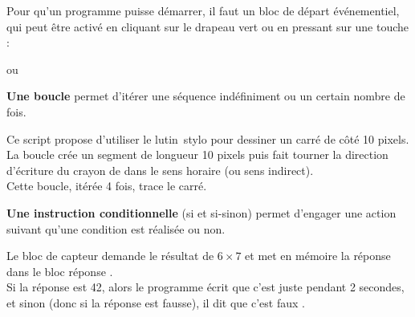 Pour qu'un programme puisse démarrer, il faut un bloc de départ événementiel, qui peut être activé en cliquant sur le drapeau vert ou en pressant sur une touche : \begin{scratch}
   {
   }
\end{scratch}
\; ou \;
\begin{scratch}
\end{scratch}

\bigskip

{\bf Une boucle} permet d'itérer une séquence indéfiniment ou un certain nombre de fois. \\ [-8mm]
\begin{exemple}
   \vspace*{1mm}
   {
   \begin{scratch}
         {
         }
   \end{scratch}
   }
   \correction
      Ce script propose d'utiliser le lutin \og stylo \fg{} pour dessiner un carré de côté 10 pixels. \\
      La boucle crée un segment de longueur 10 pixels puis fait tourner la direction d'écriture du crayon de  dans le sens horaire (ou sens indirect). \\
      Cette boucle, itérée 4 fois, trace le carré.
\end{exemple}

\bigskip

{\bf Une instruction conditionnelle} (si et si-sinon) permet d’engager une action suivant qu’une condition est réalisée ou non. \\ [-8mm]
\begin{exemple}
   \vspace*{1mm}
   {
   \begin{scratch}
         {}
         {}
   \end{scratch}
   }
   \correction
      Le bloc de capteur demande le résultat de $6\times7$ et met en mémoire la réponse dans le bloc \og réponse \fg. \\
      Si la réponse est 42, alors le programme écrit que \og c'est juste \fg{} pendant 2 secondes, et sinon (donc si la réponse est fausse), il dit que \og c'est faux \fg.
\end{exemple}

